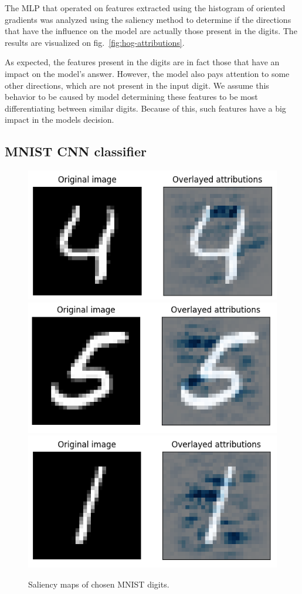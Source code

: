 \documentclass[journal, a4paper]{IEEEtran}
\begin{document}
The MLP that operated on features extracted using the histogram of oriented gradients was analyzed using the saliency method to determine
if the directions that have the influence on the model are actually those present in the digits.
The results are visualized on fig.~\ref{fig:hog-attributions}.

As expected, the features present in the digits are in fact those that have an impact on the model's answer.
However, the model also pays attention to some other directions, which are not present in the input digit.
We assume this behavior to be caused by model determining these features to be most differentiating between similar digits.
Because of this, such features have a big impact in the models decision.

\subsection{MNIST CNN classifier}\label{subsec:experiment-mnist-cnn}

\begin{figure}[ht]\centering
    \includegraphics[width=.6\linewidth]{img/saliency_mnist/4.png}
    \includegraphics[width=.6\linewidth]{img/saliency_mnist/5.png}
    \includegraphics[width=.6\linewidth]{img/saliency_mnist/1.png}
    \caption{Saliency maps of chosen MNIST digits.}\label{fig:mnist-cnn-saliency}
\end{figure}
\end{document}

